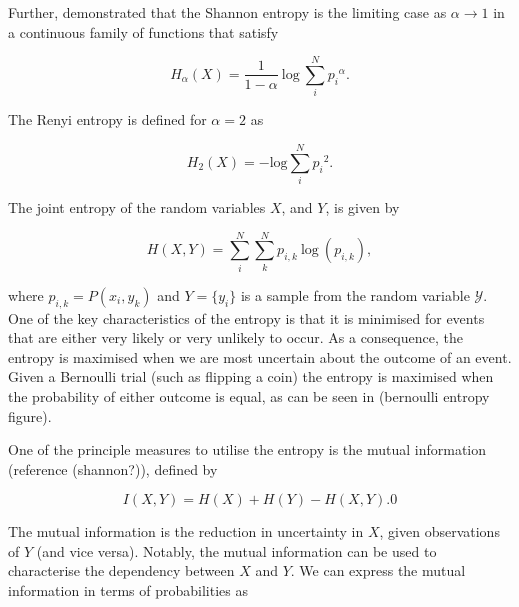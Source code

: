 \noindent Further, \cite{rrnyi1961measures} demonstrated that the Shannon entropy is the limiting case as $\alpha \rightarrow 1$ in a continuous family of functions that satisfy

\begin{equation}
	H_\alpha(X) = \frac{1}{1 -\alpha} \: \text{log}\:\sum_i^N{{p_i}^\alpha}.
\end{equation}

\noindent The Renyi entropy is defined for $\alpha = 2$ as 

\begin{equation}
	\label {renyientropy}
	H_2(X) = - \text{log} \sum_i^N{{p_i}^2}.
\end{equation}

\noindent The joint entropy of the random variables $X$, and $Y$, is given by

\begin{equation}
	H(X, Y) = \sum_i^N\sum_k^N{p_{i,k} \: \text{log} \: (p_{i,k})},
\end{equation}

\noindent where $p_{i,k} = P(x_i,y_k)$ and $Y = \{y_i\}$ is a sample from the random variable $\mathcal{Y}$. One of the key characteristics of the entropy is that it is minimised for events that are either very likely or very unlikely to occur. As a consequence, the entropy is maximised when we are most uncertain about the outcome of an event. Given a Bernoulli trial (such as flipping a coin) the entropy is maximised when the probability of either outcome is equal, as can be seen in (bernoulli entropy figure). 



One of the principle measures to utilise the entropy is the mutual information (reference (shannon?)), defined by

\begin{equation}
	I(X, Y) = H(X) + H(Y)  - H(X, Y).0
\end{equation}

The mutual information is the reduction in uncertainty in $X$, given observations of $Y$ (and vice versa). Notably, the mutual information can be used to characterise the dependency between $X$ and $Y$. We can express the mutual information in terms of probabilities as 


